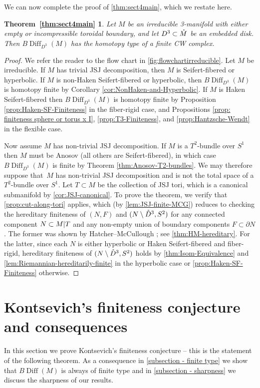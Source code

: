 \documentclass{amsart}
\theoremstyle{plain}
\theoremstyle{definition}
\DeclareMathOperator\Diff{Diff}
\newcommand{\interior}[1]{\smash{\mathring{#1}}}
\newcommand{\ca}{\smash{\mid}} %
\newcommand{\BDiff}{B\!\Diff}
\newcommand{\fakeenv}{} %
\newenvironment{rerestate}[3]  %
{
  \renewcommand{\fakeenv}{#3}   %
  \theoremstyle{plain}
  \newtheorem*{\fakeenv}{#1~\ref{#2}} %
  \begin{\fakeenv}  
}
{ \end{\fakeenv} }
\begin{document}
We can now complete the proof of \cref{thm:sect4main}, which we restate here.
\begin{rerestate}{Theorem}{thm:sect4main}{restating:sect4main}
    Let $M$ be an irreducible 3-manifold with either empty or incompressible toroidal boundary, and let $D^3\subset \interior{M}$ be an embedded disk. 
    Then $\BDiff_{D^3}(M)$ has the homotopy type of a finite CW complex.
\end{rerestate}
\begin{proof}
     We refer the reader to the flow chart in \cref{fig:flowchartirreducible}. Let $M$ be irreducible. If $M$ has trivial JSJ decomposition, then $M$ is Seifert-fibered or hyperbolic.
    If $M$ is  non-Haken Seifert-fibered or hyperbolic, then $\BDiff_{D^3}(M)$ is homotopy finite by Corollary \ref{cor:NonHaken-and-Hyperbolic}. If $M$ is Haken Seifert-fibered then $\BDiff_{D^3}(M)$ is homotopy finite by Proposition \ref{prop:Haken-SF-Finiteness} in the fiber-rigid case, and Propositions \ref{prop: finiteness sphere or torus x I}, \ref{prop:T3-Finiteness}, and \ref{prop:Hantzsche-Wendt} in the flexible case.  
    
    
    Now assume $M$ has non-trivial JSJ decomposition. If $M$ is a  $T^2$-bundle over $S^1$ then $M$ must be Anosov (all others are Seifert-fibered), in which case $\BDiff_{D^3}(M)$ is finite by Theorem \ref{thm:Anosov-T2-bundles}.  We may therefore suppose that~$M$ has non-trivial JSJ decomposition and is not the total space of a $T^2$-bundle over $S^1$. Let $T \subset M$ be the collection of JSJ tori, which is a canonical submanifold by \cref{cor:JSJ-canonical}. To prove the theorem, we verify that \cref{prop:cut-along-tori} applies,  which (by \cref{lem:JSJ-finite-MCG}) reduces to checking the hereditary finiteness of $(N, F)$ and $(N \setminus \interior{D}^3, S^2)$ for any connected component $N \subset M \ca T$ and any non-empty union of boundary components $F \subset \partial N$. 
    The former was shown by Hatcher--McCullough \cite{HatcherMcCullough}; see \cref{thm:HM-hereditary}.
    For the latter, since each $N$ is either hyperbolic or Haken Seifert-fibered and fiber-rigid, hereditary finiteness of $(N \setminus \interior{D}^3, S^2)$ holds by \cref{thm:Isom-Equivalence} and \cref{lem:Riemannian-hereditarily-finite} in the hyperbolic case or  \cref{prop:Haken-SF-Finiteness} otherwise.
\end{proof}

\section{Kontsevich's finiteness conjecture and consequences} \label{section: finiteness of BDiff}
In this section we prove Kontsevich's finiteness conjecture \cite[Problem 3.48]{KirbyProblems} -- this is the statement of the following theorem. 
As a consequence in \cref{subsection - finite type} we show that $\BDiff(M)$ is always of finite type and in \cref{subsection - sharpness} we discuss the sharpness of our results.
\end{document}

